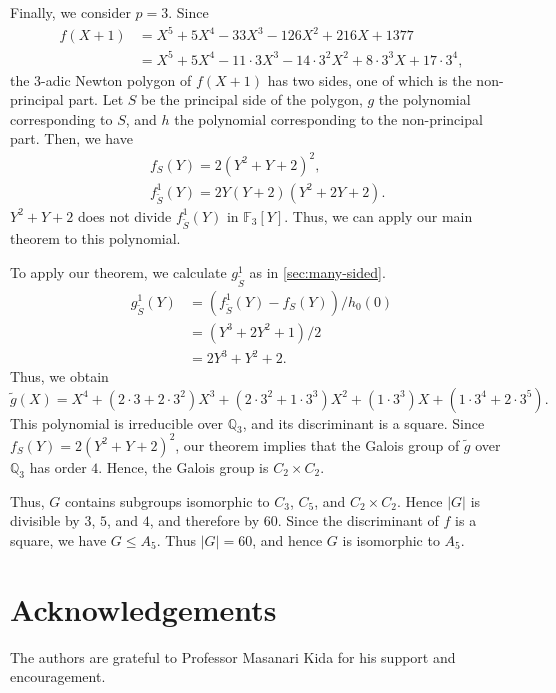 \documentclass{article}
\newcommand{\field}[1]{\mathbb{#1}}
\newcommand{\Q}{\field{Q}}
\newcommand{\F}{\field{F}}
\theoremstyle{definition}
\theoremstyle{remark}
\numberwithin{equation}{section}
\begin{document}
  Finally, we consider $p=3$.
  Since
  \begin{align}
    f(X+1)  &= X^5 + 5X^4 - 33X^3 - 126X^2 + 216X + 1377 \\
            &= X^5 + 5X^4 - 11\cdot 3X^3 - 14\cdot 3^2X^2 + 8\cdot 3^3X + 17\cdot3^4,
  \end{align}
  the $3$-adic Newton polygon of $f(X+1)$ has two sides, one of which is the non-principal part.
  Let $S$ be the principal side of the polygon, $g$ the polynomial corresponding to $S$, and $h$ the polynomial corresponding to the non-principal part.
  Then, we have
  \begin{align}
    &f_{S}(Y) = 2(Y^2 + Y + 2)^2,\\
    &f^{1}_{\tilde{S}}(Y) = 2Y(Y+2)(Y^2+2Y+2).
  \end{align}
  $Y^2 + Y + 2$ does not divide $f^{1}_{\tilde{S}}(Y)$ in $\F_{3}[Y]$.
  Thus, we can apply our main theorem to this polynomial.

  To apply our theorem, we calculate $g^{1}_{\tilde{S}}$ as in \cref{sec:many-sided}.
  \begin{align}
    g^{1}_{\tilde{S}}(Y)  &= \left(f^{1}_{\tilde{S}}(Y) - f_{S}(Y)\right)/h_{0}(0)\\
                          &= (Y^3 + 2Y^2 + 1)/2\\
                          &= 2Y^3 + Y^2 + 2.
  \end{align}
  Thus, we obtain
  \[
    \tilde{g}(X) = X^4+(2\cdot 3+2\cdot3^2)X^3+(2\cdot 3^2+1\cdot 3^3)X^2+(1\cdot3^3)X+(1\cdot 3^4+2\cdot 3^5).
  \]
  This polynomial is irreducible over $\Q_{3}$, and its discriminant is a square.
  Since $f_{S}(Y) = 2(Y^2 + Y + 2)^2$, our theorem implies that the Galois group of $\tilde{g}$ over $\Q_{3}$ has order $4$.
  Hence, the Galois group is $C_{2}\times C_{2}$.

  Thus, $G$ contains subgroups isomorphic to $C_3$, $C_5$, and $C_2 \times C_2$. Hence $|G|$ is divisible by $3$, $5$, and $4$, and therefore by $60$. 
  Since the discriminant of $f$ is a square, we have $G \le A_5$. Thus $|G| = 60$, and hence $G$ is isomorphic to $A_5$. 

  \section*{Acknowledgements}
  The authors are grateful to Professor Masanari Kida for his support and encouragement. 
\end{document}
